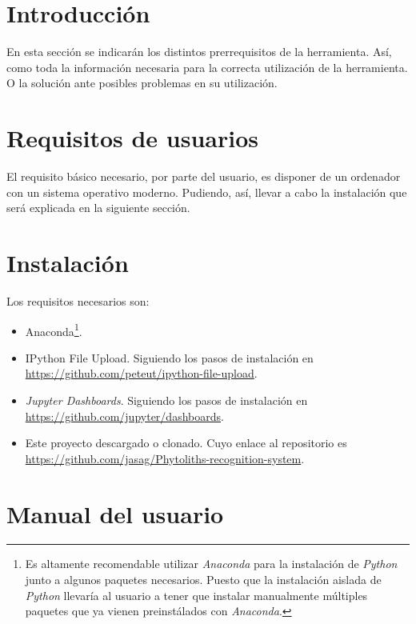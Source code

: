 
\section{Introducción}

En esta sección se indicarán los distintos prerrequisitos de la herramienta. Así, como toda la información necesaria para la correcta utilización de la herramienta. O la solución ante posibles problemas en su utilización.

\section{Requisitos de usuarios}

El requisito básico necesario, por parte del usuario, es disponer de un ordenador con un sistema operativo moderno. Pudiendo, así, llevar a cabo la instalación que será explicada en la siguiente sección.

\section{Instalación}
Los requisitos necesarios son:

\begin{itemize}
	\item Anaconda\footnote{Es altamente recomendable utilizar \textit{Anaconda} para la instalación de \textit{Python} junto a algunos paquetes necesarios. Puesto que la instalación aislada de \textit{Python} llevaría al usuario a tener que instalar manualmente múltiples paquetes que ya vienen preinstálados con \textit{Anaconda}.}.

	\item IPython File Upload. Siguiendo los pasos de instalación en \url{https://github.com/peteut/ipython-file-upload}.

	\item \textit{Jupyter Dashboards}. Siguiendo los pasos de instalación en \url{https://github.com/jupyter/dashboards}.

	\item Este proyecto descargado o clonado. Cuyo enlace al repositorio es \url{https://github.com/jasag/Phytoliths-recognition-system}.
\end{itemize}

\section{Manual del usuario}

